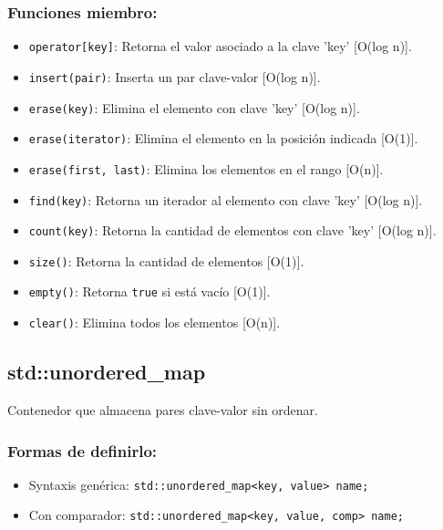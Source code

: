 \subsubsection{Funciones miembro:}
\begin{itemize}
  \item \texttt{operator[key]}: Retorna el valor asociado a la clave 'key' [O(log n)].
  \item \texttt{insert(pair)}: Inserta un par clave-valor [O(log n)]. 
  \item \texttt{erase(key)}: Elimina el elemento con clave 'key' [O(log n)].
  \item \texttt{erase(iterator)}: Elimina el elemento en la posición indicada [O(1)].
  \item \texttt{erase(first, last)}: Elimina los elementos en el rango [O(n)].
  \item \texttt{find(key)}: Retorna un iterador al elemento con clave 'key' [O(log n)]. 
  \item \texttt{count(key)}: Retorna la cantidad de elementos con clave 'key' [O(log n)]. 
  \item \texttt{size()}: Retorna la cantidad de elementos [O(1)]. 
  \item \texttt{empty()}: Retorna \texttt{true} si está vacío [O(1)]. 
  \item \texttt{clear()}: Elimina todos los elementos [O(n)]. 
\end{itemize}

\subsection{std::unordered\_map}
\label{subsec:std_unordered_map}
Contenedor que almacena pares clave-valor sin ordenar. 

\subsubsection{Formas de definirlo:}
\begin{itemize}
  \item Syntaxis genérica: \texttt{std::unordered\_map<key, value> name;}
  \item Con comparador: \texttt{std::unordered\_map<key, value, comp> name;}
\end{itemize}

